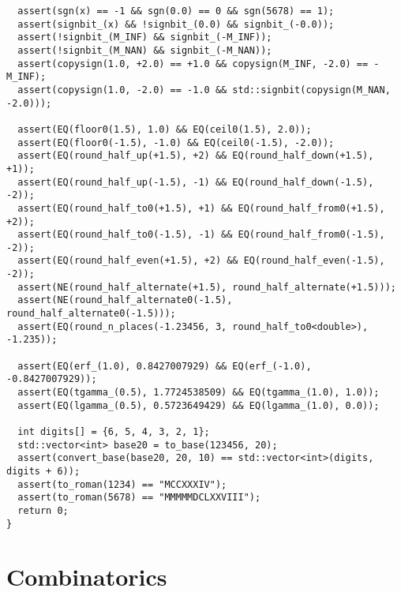 \begin{lstlisting}
  assert(sgn(x) == -1 && sgn(0.0) == 0 && sgn(5678) == 1);
  assert(signbit_(x) && !signbit_(0.0) && signbit_(-0.0));
  assert(!signbit_(M_INF) && signbit_(-M_INF));
  assert(!signbit_(M_NAN) && signbit_(-M_NAN));
  assert(copysign(1.0, +2.0) == +1.0 && copysign(M_INF, -2.0) == -M_INF);
  assert(copysign(1.0, -2.0) == -1.0 && std::signbit(copysign(M_NAN, -2.0)));

  assert(EQ(floor0(1.5), 1.0) && EQ(ceil0(1.5), 2.0));
  assert(EQ(floor0(-1.5), -1.0) && EQ(ceil0(-1.5), -2.0));
  assert(EQ(round_half_up(+1.5), +2) && EQ(round_half_down(+1.5), +1));
  assert(EQ(round_half_up(-1.5), -1) && EQ(round_half_down(-1.5), -2));
  assert(EQ(round_half_to0(+1.5), +1) && EQ(round_half_from0(+1.5), +2));
  assert(EQ(round_half_to0(-1.5), -1) && EQ(round_half_from0(-1.5), -2));
  assert(EQ(round_half_even(+1.5), +2) && EQ(round_half_even(-1.5), -2));
  assert(NE(round_half_alternate(+1.5), round_half_alternate(+1.5)));
  assert(NE(round_half_alternate0(-1.5), round_half_alternate0(-1.5)));
  assert(EQ(round_n_places(-1.23456, 3, round_half_to0<double>), -1.235));

  assert(EQ(erf_(1.0), 0.8427007929) && EQ(erf_(-1.0), -0.8427007929));
  assert(EQ(tgamma_(0.5), 1.7724538509) && EQ(tgamma_(1.0), 1.0));
  assert(EQ(lgamma_(0.5), 0.5723649429) && EQ(lgamma_(1.0), 0.0));

  int digits[] = {6, 5, 4, 3, 2, 1};
  std::vector<int> base20 = to_base(123456, 20);
  assert(convert_base(base20, 20, 10) == std::vector<int>(digits, digits + 6));
  assert(to_roman(1234) == "MCCXXXIV");
  assert(to_roman(5678) == "MMMMMDCLXXVIII");
  return 0;
}
\end{lstlisting}

\section{Combinatorics}
\setcounter{section}{2}
\setcounter{subsection}{0}
